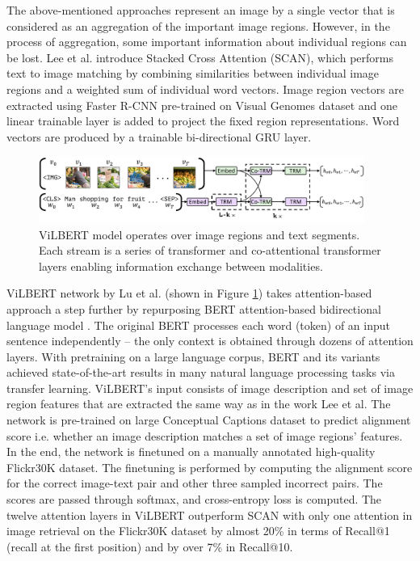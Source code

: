 The above-mentioned approaches represent an image by a single vector that is considered as an aggregation of the important image regions. However, in the process of aggregation, some important information about individual regions can be lost. Lee et al. \cite{Lee_2018_ECCV} introduce Stacked Cross Attention (SCAN), which performs text to image matching by combining similarities between individual image regions and a weighted sum of individual word vectors. Image region vectors are extracted using Faster R-CNN \cite{FasterRCNN} pre-trained on Visual Genomes dataset \cite{krishna2017visual} and one linear trainable layer is added to project the fixed region representations. Word vectors are produced by a trainable bi-directional GRU layer.

\begin{figure}
    \centering
    \includegraphics[width=0.95\textwidth]{img/vlbert_converted.pdf}
    \caption[ViLBERT model for image/description matching]{ViLBERT model \cite{ViLBERT} operates over image regions and text segments. Each stream is a series of transformer and co-attentional transformer layers enabling information exchange between modalities.}
    \label{fig:vlbert}
\end{figure}
ViLBERT \cite{ViLBERT} network by Lu et al. (shown in Figure \ref{fig:vlbert}) takes attention-based approach a step further by repurposing BERT attention-based bidirectional language model \cite{bert}. The original BERT processes each word (token) of an input sentence independently -- the only context is obtained through dozens of attention layers. With pretraining on a large language corpus, BERT and its variants achieved state-of-the-art results in many natural language processing tasks via transfer learning. ViLBERT's input consists of image description and set of image region features that are extracted the same way as in the work Lee et al. The network is pre-trained on large Conceptual Captions \cite{sharma2018conceptual} dataset to predict alignment score i.e. whether an image description matches a set of image regions' features. In the end, the network is finetuned on a manually annotated high-quality Flickr30K dataset. The finetuning is performed by computing the alignment score for the correct image-text pair and other three sampled incorrect pairs. The scores are passed through softmax, and cross-entropy loss is computed. The twelve attention layers in ViLBERT outperform SCAN with only one attention in image retrieval on the Flickr30K dataset by almost 20\% in terms of Recall@1 (recall at the first position) and by over 7\% in Recall@10.

